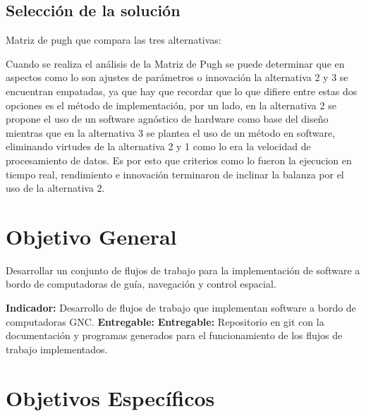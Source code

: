 \documentclass[12pt]{article}
\begin{document}
\subsection{Selección de la solución}

Matriz de pugh que compara las tres alternativas:


Cuando se realiza el análisis de la Matriz de Pugh se puede determinar que en aspectos como lo son ajustes de parámetros o innovación la alternativa 2 y 3 se encuentran empatadas, ya que hay que recordar que lo que difiere entre estas dos opciones es el método de implementación, por un lado, en la alternativa 2 se propone el uso de un software agnóstico de hardware como base del diseño mientras que en la alternativa 3 se plantea el uso de un método en software, eliminando virtudes de la alternativa 2 y 1 como lo era la velocidad de procesamiento de datos. Es por esto que criterios como lo fueron la ejecucion en tiempo real, rendimiento e innovación terminaron de inclinar la balanza por el uso de la alternativa 2.

\section{Objetivo General}

Desarrollar un conjunto de flujos de trabajo para la implementación de software a bordo de computadoras de guía, navegación y control espacial.

\textbf{Indicador:} Desarrollo de flujos de trabajo que implementan software a bordo de computadoras GNC.\newline
\textbf{Entregable:} \textbf{Entregable:} Repositorio en git con la documentación y programas generados para el funcionamiento de los flujos de trabajo implementados.

\section{Objetivos Específicos}
\end{document}
